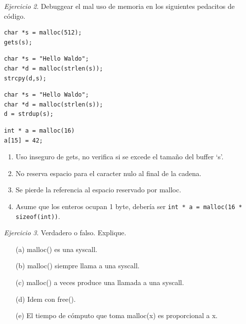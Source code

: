 \documentclass[12pt]{article}
\begin{document}
\noindent \textit{Ejercicio 2}. Debuggear el mal uso de memoria en los siguientes pedacitos de código.

\begin{lstlisting}[style=CStyle]
char *s = malloc(512);
gets(s);
\end{lstlisting}
\begin{lstlisting}[style=CStyle]
char *s = "Hello Waldo";
char *d = malloc(strlen(s));
strcpy(d,s);
\end{lstlisting}
\begin{lstlisting}[style=CStyle]
char *s = "Hello Waldo";
char *d = malloc(strlen(s));
d = strdup(s);
\end{lstlisting}
\begin{lstlisting}[style=CStyle]
int * a = malloc(16)
a[15] = 42;
\end{lstlisting}

\begin{rta}
    \begin{enumerate}
        \item Uso inseguro de gets, no verifica si se excede el tamaño del buffer ‘s’.
        \item No reserva espacio para el caracter nulo al final de la cadena.
        \item Se pierde la referencia al espacio reservado por malloc.
        \item Asume que los enteros ocupan 1 byte, debería ser \texttt{int * a = malloc(16 * sizeof(int))}.
    \end{enumerate}
\end{rta}

\noindent \textit{Ejercicio 3}. Verdadero o falso. Explique.

\begin{itemize}
    \item[(a)] malloc() es una syscall.
    \item[(b)] malloc() siempre llama a una syscall.
    \item[(c)] malloc() a veces produce una llamada a una syscall.
    \item[(d)] Idem con free().
    \item[(e)] El tiempo de cómputo que toma malloc(x) es proporcional a x.
\end{itemize}
\end{document}
